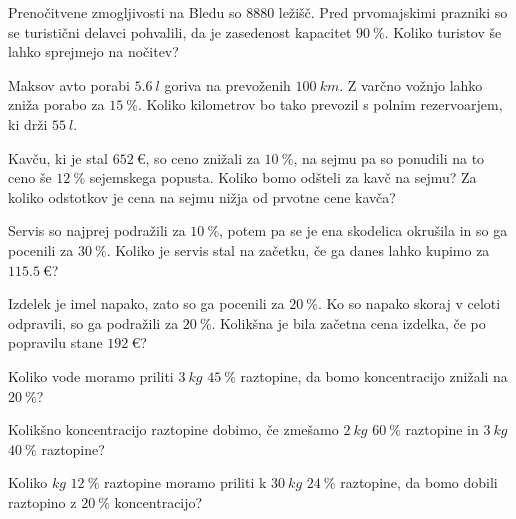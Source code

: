                 \begin{naloga}
                    Prenočitvene zmogljivosti na Bledu so $8880$ ležišč. Pred prvomajskimi prazniki so se turistični delavci pohvalili,
                    da je zasedenost kapacitet $90~\%$. Koliko turistov še lahko sprejmejo na nočitev? 
                \end{naloga}
    
                \begin{naloga}
                    Maksov avto porabi $5.6~l$ goriva na prevoženih $100~km$. 
                    Z varčno vožnjo lahko zniža porabo za $15~\%$.
                    Koliko kilometrov bo tako prevozil s polnim rezervoarjem, ki drži $55~l$. 
                \end{naloga}
            
    
    
            
                \begin{naloga}
                    Kavču, ki je stal $652~€$, so ceno znižali za $10~\%$, na sejmu pa so ponudili na to ceno še $12~\%$ sejemskega popusta.
                    Koliko bomo odšteli za kavč na sejmu? Za koliko odstotkov je cena na sejmu nižja od prvotne cene kavča? 
                \end{naloga}
    
                
                \begin{naloga}
                    Servis so najprej podražili za $10~\%$, potem pa se je ena skodelica okrušila in so ga pocenili za $30~\%$.
                    Koliko je servis stal na začetku, če ga danes lahko kupimo za $115.5~€$? 
                \end{naloga}
    
                \begin{naloga}
                    Izdelek je imel napako, zato so ga pocenili za $20~\%$. Ko so napako skoraj v celoti odpravili, so ga podražili za $20~\%$.
                    Kolikšna je bila začetna cena izdelka, če po popravilu stane $192~€$? 
                \end{naloga}
    
            
    
    
            
                \begin{naloga}
                    Koliko vode moramo priliti $3~kg$ $45~\%$ raztopine, da bomo koncentracijo znižali na $20~\%$? 
                \end{naloga}
    
                \begin{naloga}
                    Kolikšno koncentracijo raztopine dobimo, če zmešamo $2~kg$ $60~\%$ raztopine in $3~kg$ $40~\%$ raztopine? 
                \end{naloga}
    
                \begin{naloga}
                    Koliko $kg$ $12~\%$ raztopine moramo priliti k $30~kg$ $24~\%$ raztopine, da bomo dobili raztopino z $20~\%$ koncentracijo? 
                \end{naloga}
            





